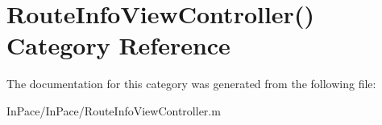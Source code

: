 \hypertarget{categoryRouteInfoViewController_07_08}{\section{Route\-Info\-View\-Controller() Category Reference}
\label{categoryRouteInfoViewController_07_08}
}


The documentation for this category was generated from the following file\-:\begin{DoxyCompactItemize}
\item 
In\-Pace/\-In\-Pace/Route\-Info\-View\-Controller.\-m\end{DoxyCompactItemize}
